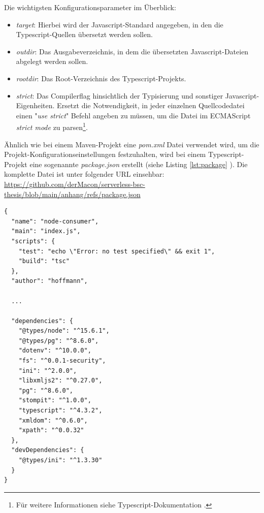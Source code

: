 Die wichtigsten Konfigurationsparameter im Überblick:

\begin{itemize}
  \item \emph{target}: Hierbei wird der Javascript-Standard angegeben, in den die Typescript-Quellen übersetzt werden sollen.
  \item \emph{outdir}: Das Ausgabeverzeichnis, in dem die übersetzten Javascript-Dateien abgelegt werden sollen.
  \item \emph{rootdir}: Das Root-Verzeichnis des Typescript-Projekts.
  \item \emph{strict}: Das Compilerflag hinsichtlich der Typisierung und sonstiger Javascript-Eigenheiten. Ersetzt die Notwendigkeit, in jeder einzelnen Quellcodedatei einen "\emph{use strict}" Befehl angeben zu müssen, um die Datei im ECMAScript \emph{strict mode} zu parsen\footnote{Für weitere Informationen siehe Typescript-Dokumentation \cite[Kapitel~tsconfig]{typescript-doc}.}.
\end{itemize}

Ähnlich wie bei einem Maven-Projekt eine \emph{pom.xml} Datei verwendet wird, um die Projekt-Konfigurationseinstellungen festzuhalten, wird bei einem Typescript-Projekt eine sogenannte \emph{package.json} erstellt (siehe Listing \ref{lst:package} ). Die komplette Datei ist unter folgender URL einsehbar: \url{https://github.com/derMacon/serverless-bsc-thesis/blob/main/anhang/refs/package.json}

\newpage

\begin{lstlisting}[style=javaStyle,caption={Typescript -- package.json},label=lst:package]
  {
  "name": "node-consumer",
  "main": "index.js",
  "scripts": {
    "test": "echo \"Error: no test specified\" && exit 1",
    "build": "tsc"
  },
  "author": "hoffmann",

  ...

  "dependencies": {
    "@types/node": "^15.6.1",
    "@types/pg": "^8.6.0",
    "dotenv": "^10.0.0",
    "fs": "^0.0.1-security",
    "ini": "^2.0.0",
    "libxmljs2": "^0.27.0",
    "pg": "^8.6.0",
    "stompit": "^1.0.0",
    "typescript": "^4.3.2",
    "xmldom": "^0.6.0",
    "xpath": "^0.0.32"
  },
  "devDependencies": {
    "@types/ini": "^1.3.30"
  }
}
\end{lstlisting}

